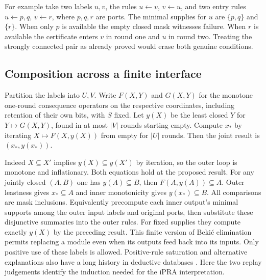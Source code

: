 For example take two labels $u,v$, the rules $u\leftarrow v$, $v\leftarrow u$, and two entry rules $u\leftarrow p,q$, $v\leftarrow r$, where $p,q,r$ are ports. The minimal supplies for $u$ are $\{p,q\}$ and $\{r\}$. When only $p$ is available the empty closed mask witnesses failure. When $r$ is available the certificate enters $v$ in round one and $u$ in round two. Treating the strongly connected pair as already proved would erase both genuine conditions.

\subsection{Composition across a finite interface}
Partition the labels into $U,V$. Write $F(X,Y)$ and $G(X,Y)$ for the monotone one-round consequence operators on the respective coordinates, including retention of their own bits, with $S$ fixed. Let $y(X)$ be the least closed $Y$ for $Y\mapsto G(X,Y)$, found in at most $|V|$ rounds starting empty. Compute $x_*$ by iterating $X\mapsto F(X,y(X))$ from empty for $|U|$ rounds. Then the joint result is $(x_*,y(x_*))$.

Indeed $X\subseteq X'$ implies $y(X)\subseteq y(X')$ by iteration, so the outer loop is monotone and inflationary. Both equations hold at the proposed result. For any jointly closed $(A,B)$ one has $y(A)\subseteq B$, then $F(A,y(A))\subseteq A$. Outer leastness gives $x_*\subseteq A$ and inner monotonicity gives $y(x_*)\subseteq B$. All comparisons are mask inclusions. Equivalently precompute each inner output's minimal supports among the outer input labels and original ports, then substitute these disjunctive summaries into the outer rules. For fixed supplies they compute exactly $y(X)$ by the preceding result. This finite version of Beki\'c elimination permits replacing a module even when its outputs feed back into its inputs. Only positive use of these labels is allowed. Positive-rule saturation and alternative explanations also have a long history in deductive databases \cite{green}. Here the two replay judgements identify the induction needed for the iPRA interpretation.

